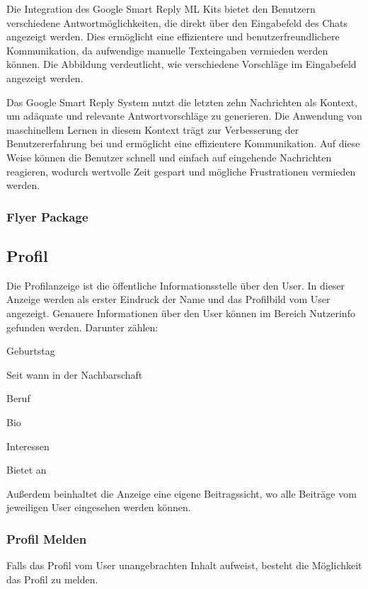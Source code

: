 Die Integration des Google Smart Reply ML Kits bietet den Benutzern verschiedene Antwortmöglichkeiten, die direkt über den Eingabefeld des Chats angezeigt werden. Dies ermöglicht eine effizientere und benutzerfreundlichere Kommunikation, da aufwendige manuelle Texteingaben vermieden werden können. Die Abbildung verdeutlicht, wie verschiedene Vorschläge im Eingabefeld angezeigt werden.

Das Google Smart Reply System nutzt die letzten zehn Nachrichten als Kontext, um adäquate und relevante Antwortvorschläge zu generieren. Die Anwendung von maschinellem Lernen in diesem Kontext trägt zur Verbesserung der Benutzererfahrung bei und ermöglicht eine effizientere Kommunikation. Auf diese Weise können die Benutzer schnell und einfach auf eingehende Nachrichten reagieren, wodurch wertvolle Zeit gespart und mögliche Frustrationen vermieden werden.

\subsubsection{Flyer Package}

\subsection{Profil}
Die Profilanzeige ist die öffentliche Informationsstelle über den User. In dieser Anzeige werden als erster Eindruck der Name und das Profilbild vom User angezeigt. Genauere Informationen über den User können im Bereich Nutzerinfo gefunden werden. Darunter zählen:
\begin{compactitem}
  \item Geburtstag
  \item Seit wann in der Nachbarschaft
  \item Beruf
  \item Bio
  \item Interessen
  \item Bietet an
\end{compactitem}
Außerdem beinhaltet die Anzeige eine eigene Beitragssicht, wo alle Beiträge vom jeweiligen User eingesehen werden können.

\subsubsection{Profil Melden}
Falls das Profil vom User unangebrachten Inhalt aufweist, besteht die Möglichkeit das Profil zu melden.

